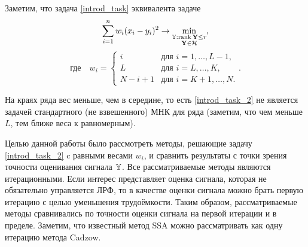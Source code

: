 \documentclass[12pt,a4paper,fleqn,leqno]{article}
\def\rank{\mathop{\mathrm{rank}}}
\begin{document}
Заметим, что задача \eqref{introd_task} эквивалента задаче
\begin{equation}\label{introd_task_2}
\sum_{i = 1}^n w_i(x_i - y_i)^2 \to \min_{\substack{\tsY: \rank \bfY \le r \\ \bfY \in \calH}},
\end{equation}
\begin{equation*}
\text{где} \quad w_i = \begin{cases}
i & \text{для $i = 1, \ldots, L-1,$}\\
L & \text{для $i = L, \ldots, K,$}\\
N - i + 1 & \text{для $i = K + 1, \ldots, N.$}
\end{cases}.
\end{equation*}

На краях ряда вес меньше, чем в середине, то есть \eqref{introd_task_2} не является задачей стандартного (не взвешенного) МНК для ряда (заметим, что чем меньше $L$, тем ближе веса к равномерным).

Целью данной работы было рассмотреть методы, решающие задачу \eqref{introd_task_2} c равными весами $w_i$, и сравнить результаты с точки зрения точности оценивания сигнала $\mathbb{Y}$. Все рассматриваемые методы являются итерационными. Если интерес представляет оценка сигнала, которая не обязательно управляется ЛРФ, то в качестве оценки сигнала можно брать первую итерацию с целью уменьшения трудоёмкости. Таким образом, рассматриваемые методы сравнивались по точности оценки сигнала на первой итерации и в пределе. Заметим, что известный метод SSA можно рассматривать как одну итерацию метода Cadzow.
\end{document}
